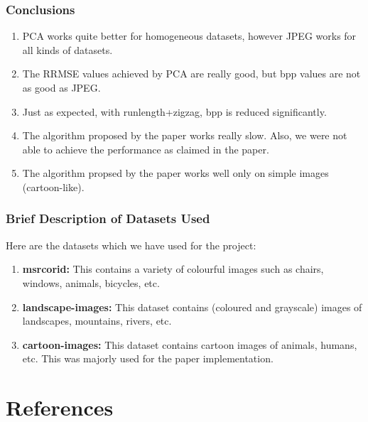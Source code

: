 \documentclass[Serif, 10pt, brown]{beamer}
\theoremstyle{example}
\theoremstyle{plain}
\begin{document}
\begin{frame}
	\frametitle{Conclusions}
	\begin{enumerate}
		\item PCA works quite better for homogeneous datasets, however JPEG works for all kinds of datasets.
		\item The RRMSE values achieved by PCA are really good, but bpp values are not as good as JPEG.
		\item Just as expected, with runlength+zigzag, bpp is reduced significantly.
		\item The algorithm proposed by the paper works really slow. Also, we were not able to achieve the performance as claimed in the paper.
		\item The algorithm propsed by the paper works well only on simple images (cartoon-like).
	\end{enumerate}
\end{frame}

\begin{frame}
	\frametitle{Brief Description of Datasets Used}
	Here are the datasets which we have used for the project:
	\begin{enumerate}
		\item {\bf msrcorid:} This contains a variety of colourful images such as chairs, windows, animals, bicycles, etc.
		\item {\bf landscape-images:} This dataset contains (coloured and grayscale) images of landscapes, mountains, rivers, etc.
		\item {\bf cartoon-images:} This dataset contains cartoon images of animals, humans, etc. This was majorly used for the paper implementation.
	\end{enumerate}
\end{frame}

\section{References}
\end{document}
